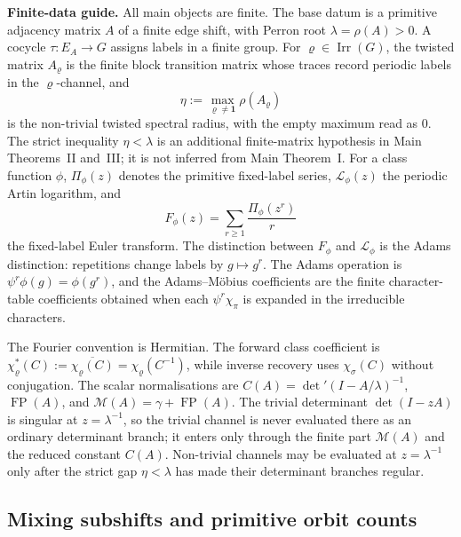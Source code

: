 \documentclass[11pt,a4paper]{amsart}
\theoremstyle{plain}
\theoremstyle{definition}
\theoremstyle{remark}
\DeclareMathOperator{\Irr}{Irr}
\DeclareMathOperator{\FP}{FP}
\begin{document}
\medskip
\noindent\textbf{Finite-data guide.}
All main objects are finite.  The base datum is a primitive adjacency
matrix \(A\) of a finite edge shift, with Perron root
\(\lambda=\rho(A)>0\).  A cocycle \(\tau:E_A\to G\) assigns labels in a
finite group.  For \(\varrho\in\Irr(G)\), the twisted matrix
\(A_\varrho\) is the finite block transition matrix whose traces record
periodic labels in the \(\varrho\)-channel, and
\[
  \eta:=\max_{\varrho\ne\mathbf1}\rho(A_\varrho)
\]
is the non-trivial twisted spectral radius, with the empty maximum read
as \(0\).  The strict inequality \(\eta<\lambda\) is an additional
finite-matrix hypothesis in Main Theorems~II and~III; it is not inferred
from Main Theorem~I.  For a class function \(\phi\),
\(\Pi_\phi(z)\) denotes the primitive fixed-label series,
\(\mathcal L_\phi(z)\) the periodic Artin logarithm, and
\[
  F_\phi(z)=\sum_{r\ge1}\frac{\Pi_\phi(z^r)}{r}
\]
the fixed-label Euler transform.  The distinction between
\(F_\phi\) and \(\mathcal L_\phi\) is the Adams distinction: repetitions
change labels by \(g\mapsto g^r\).  The Adams operation is
\(\psi^r\phi(g)=\phi(g^r)\), and the Adams--M\"obius coefficients are the
finite character-table coefficients obtained when each
\(\psi^r\chi_\pi\) is expanded in the irreducible characters.

The Fourier convention is Hermitian.  The forward class coefficient is
\(\chi_\varrho^\ast(C):=\overline{\chi_\varrho(C)}
=\chi_\varrho(C^{-1})\), while inverse recovery uses
\(\chi_\sigma(C)\) without conjugation.  The scalar normalisations are
\(C(A)=\det'(I-A/\lambda)^{-1}\),
\(\FP(A)\), and \(\mathcal M(A)=\gamma+\FP(A)\).  The trivial determinant
\(\det(I-zA)\) is singular at \(z=\lambda^{-1}\), so the trivial channel
is never evaluated there as an ordinary determinant branch; it enters
only through the finite part \(\mathcal M(A)\) and the reduced constant
\(C(A)\).  Non-trivial channels may be evaluated at
\(z=\lambda^{-1}\) only after the strict gap \(\eta<\lambda\) has made
their determinant branches regular.

\subsection{Mixing subshifts and primitive orbit counts}
\end{document}
